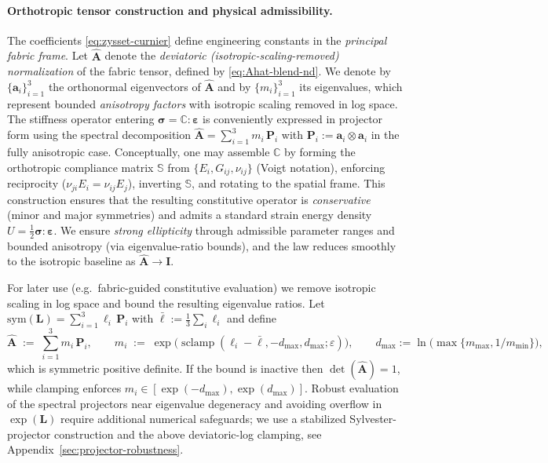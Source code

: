 \paragraph{Orthotropic tensor construction and physical admissibility.}
The coefficients \eqref{eq:zysset-curnier} define engineering constants in the \emph{principal fabric frame}.
Let $\widehat{\mathbf{A}}$ denote the \emph{deviatoric (isotropic-scaling-removed) normalization} of the fabric tensor, defined by \eqref{eq:Ahat-blend-nd}. We denote by $\{\mathbf{a}_i\}_{i=1}^3$ the orthonormal eigenvectors of $\widehat{\mathbf{A}}$ and by $\{m_i\}_{i=1}^3$ its eigenvalues, which represent bounded \emph{anisotropy factors} with isotropic scaling removed in log space.
The stiffness operator entering $\boldsymbol{\sigma}=\mathbb{C}:\boldsymbol{\varepsilon}$ is conveniently expressed in projector form using the spectral decomposition
\(
\widehat{\mathbf{A}}=\sum_{i=1}^3 m_i\,\mathbf{P}_i
\)
with $\mathbf{P}_i:=\mathbf{a}_i\otimes\mathbf{a}_i$ in the fully anisotropic case. Conceptually, one may assemble $\mathbb{C}$ by forming the orthotropic compliance matrix $\mathbb{S}$ from $\{E_i,G_{ij},\nu_{ij}\}$ (Voigt notation), enforcing reciprocity ($\nu_{ji}E_i=\nu_{ij}E_j$), inverting $\mathbb{S}$, and rotating to the spatial frame.
This construction ensures that the resulting constitutive operator is \emph{conservative} (minor and major symmetries) and admits a standard strain energy density $U=\tfrac12\boldsymbol{\sigma}:\boldsymbol{\varepsilon}$.
We ensure \emph{strong ellipticity} through admissible parameter ranges and bounded anisotropy (via eigenvalue-ratio bounds), and the law reduces smoothly to the isotropic baseline as $\widehat{\mathbf{A}}\to\mathbf{I}$.

For later use (e.g.\ fabric-guided constitutive evaluation) we remove isotropic scaling in log space and bound the resulting eigenvalue ratios. Let $\mathrm{sym}(\mathbf{L})=\sum_{i=1}^3 \ell_i\,\mathbf{P}_i$ with $\bar\ell:=\tfrac13\sum_i \ell_i$  and define
\begin{equation}\label{eq:Ahat-blend-nd}
\widehat{\mathbf{A}} \;:=\; \sum_{i=1}^3 m_i\,\mathbf{P}_i,\qquad
m_i \;:=\; \exp\!\Big(\operatorname{sclamp}(\ell_i-\bar\ell, -d_{\max}, d_{\max}; \varepsilon)\Big),\qquad
d_{\max}:=\ln\!\Big(\max\{m_{\max},1/m_{\min}\}\Big),
\end{equation}
which is symmetric positive definite. If the bound is inactive then $\det(\widehat{\mathbf{A}})=1$, while clamping enforces $m_i\in[\exp(-d_{\max}),\exp(d_{\max})]$. Robust evaluation of the spectral projectors near eigenvalue degeneracy and avoiding overflow in $\exp(\mathbf{L})$ require additional numerical safeguards; we use a stabilized Sylvester-projector construction and the above deviatoric-log clamping, see Appendix~\ref{sec:projector-robustness}.

